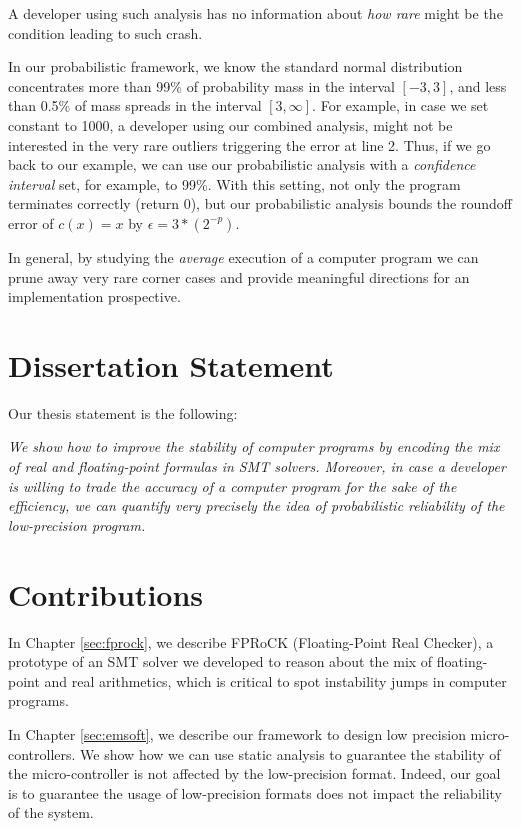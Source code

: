 %
A developer using such analysis has no information about \emph{how rare} might be the condition leading to such crash. 
%

In our probabilistic framework, we know the standard normal distribution concentrates more than 99\% of probability mass in the interval $[−3, 3]$, and less than 0.5\% of mass spreads in the interval $[3, \infty]$.
%
For example, in case we set constant to 1000, a developer using our combined analysis, might not be interested in the very rare outliers triggering the error at line 2.
%
Thus, if we go back to our example, we can use our probabilistic analysis with a \emph{confidence interval} set, for example, to 99\%.
%
%
With this setting, not only the program terminates correctly (return 0), but our probabilistic analysis bounds the roundoff error of $c(x)=x$ by $\epsilon = 3*(2^{-p})$.
%

In general, by studying the \emph{average} execution of a computer program we can prune away very rare corner cases and provide meaningful directions for an implementation prospective.
%
\section{Dissertation Statement}
%
Our thesis statement is the following: 

%
\emph{We show how to improve the stability of computer programs by encoding the mix of real and floating-point formulas in SMT solvers.
%
Moreover, in case a developer is willing to trade the accuracy of a computer program for the sake of the efficiency, we can quantify very precisely the idea of probabilistic reliability of the low-precision program.}

\section{Contributions}
%
In Chapter \ref{sec:fprock}, we describe FPRoCK (Floating-Point Real Checker), a prototype of an SMT solver we developed to reason about the mix of floating-point and real arithmetics, which is critical to spot instability jumps in computer programs.

%
%
%
%
In Chapter \ref{sec:emsoft}, we describe our framework to design low precision micro-controllers.
%
We show how we can use static analysis to guarantee the stability of the micro-controller is not affected by the low-precision format.
%
Indeed, our goal is to guarantee the usage of low-precision formats does not impact the reliability of the system.

